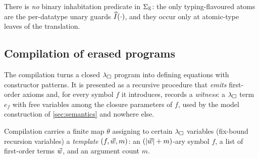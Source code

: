 There is \emph{no} binary inhabitation predicate in $\Sigma_{\mathbb{E}}$: the only
typing-flavoured atoms are the per-datatype unary guards
$\widehat{I}(\cdot)$, and they occur only at atomic-type leaves of the
translation.

\subsection{Compilation of erased programs}
\label{sec:translation-compile}

The compilation turns a closed $\lambda_{\square}$ program into defining equations
with constructor patterns.  It is presented as a recursive procedure that
\emph{emits} first-order axioms and, for every symbol $f$ it introduces,
records a \emph{witness}: a $\lambda_{\square}$ term $e_f$ with free variables among
the closure parameters of $f$, used by the model construction of
\cref{sec:semantics} and nowhere else.

Compilation carries a finite map $\theta$ assigning to certain $\lambda_{\square}$
variables (fix-bound recursion variables) a \emph{template}
$(f, \vec{w}, m)$: an $(|\vec{w}| + m)$-ary symbol $f$, a list of
first-order terms $\vec{w}$, and an argument count $m$.

